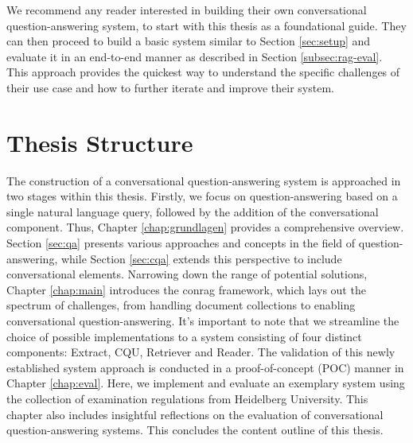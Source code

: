 We recommend any reader interested in building their own conversational question-answering system, to start with this thesis as a foundational guide. They can then proceed to build a basic system similar to Section \ref{sec:setup} and evaluate it in an end-to-end manner as described in Section \ref{subsec:rag-eval}. This approach provides the quickest way to understand the specific challenges of their use case and how to further iterate and improve their system.

\section{Thesis Structure}

The construction of a conversational question-answering system is approached in two stages within this thesis. Firstly, we focus on question-answering based on a single natural language query, followed by the addition of the conversational component. Thus, Chapter \ref{chap:grundlagen} provides a comprehensive overview. Section \ref{sec:qa} presents various approaches and concepts in the field of question-answering, while Section \ref{sec:cqa} extends this perspective to include conversational elements. Narrowing down the range of potential solutions, Chapter \ref{chap:main} introduces the \gls{conrag} framework, which lays out the spectrum of challenges, from handling document collections to enabling conversational question-answering. It's important to note that we streamline the choice of possible implementations to a system consisting of four distinct components: Extract, CQU, Retriever and Reader. The validation of this newly established system approach is conducted in a proof-of-concept (POC) manner in Chapter \ref{chap:eval}. Here, we implement and evaluate an exemplary system using the collection of examination regulations from Heidelberg University. This chapter also includes insightful reflections on the evaluation of conversational question-answering systems. This concludes the content outline of this thesis.
